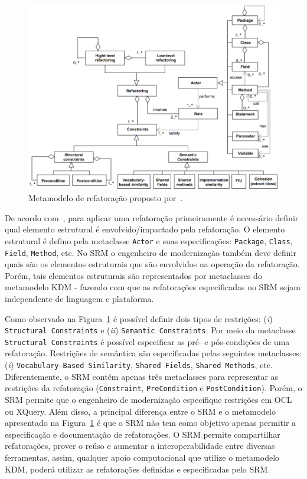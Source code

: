 \begin{figure}[h]
	\centering
	\caption{Metamodelo de refatoração proposto por~.}
	\label{fig:refactoring_metamodel_related}
	\includegraphics[scale=0.45]{images/metamodelo_refatoracao_related}
\end{figure}

De acordo com~, para aplicar uma refatoração primeiramente é necessário definir qual elemento estrutural é envolvido/impactado pela refatoração. O elemento estrutural é defino pela metaclasse \texttt{Actor} e suas especificações: \texttt{Package}, \texttt{Class}, \texttt{Field}, \texttt{Method}, etc. No SRM o engenheiro de modernização também deve definir quais são os elementos estruturais que são envolvidos na operação da refatoração. Porém, tais elementos estruturais são representados por metaclasses do metamodelo KDM - fazendo com que as refatorações especificadas no SRM sejam independente de linguagem e plataforma. 

Como observado na Figura~\ref{fig:refactoring_metamodel_related} é possível definir dois tipos de restrições: (\textit{i}) \texttt{Structural Constraints} e (\textit{ii}) \texttt{Semantic Constraints}. Por meio da metaclasse \texttt{Structural Constraints} é possível especificar as pré- e pós-condições de uma refatoração. Restrições de semântica são especificadas pelas seguintes metaclasses: (\textit{i}) \texttt{Vocabulary-Based Similarity}, \texttt{Shared Fields}, \texttt{Shared Methods}, etc. Diferentemente, o SRM contém apenas três metaclasses para representar as restrições da refatoração (\texttt{Constraint}, \texttt{PreCondition} e \texttt{PostCondition}). Porém, o SRM permite que o engenheiro de modernização especifique restrições em OCL ou XQuery. Além disso, a principal diferença entre o SRM e o metamodelo apresentado na Figura~\ref{fig:refactoring_metamodel_related} é que o SRM não tem como objetivo apenas permitir a especificação e documentação de refatorações. O SRM permite compartilhar refatorações, prover o reúso e aumentar a interoperabilidade entre diversas ferramentas, assim, qualquer apoio computacional que utilize o metamodelo KDM, poderá utilizar as refatorações definidas e especificadas pelo SRM.

